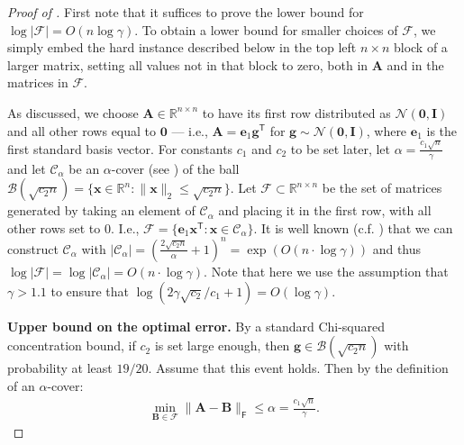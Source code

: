 \documentclass{article}[11pt]
\theoremstyle{definition}
\newcommand{\bv}[1]{\boldsymbol{\mathbf{#1}}}
\newcommand{\R}{\mathbb{R}}
\newcommand{\T}{\mathsf{T}}
\newcommand{\Fro}{\mathsf{F}}
\newcommand{\F}{\mathcal{F}}
\newcommand{\transpose}{\mathsf{T}}
\begin{document}
\begin{proof}[Proof of ]
    First note that it suffices to prove the lower bound for  $\log |\F| = O(n \log \gamma)$. To obtain a lower bound for smaller choices of $\F$, we simply embed the hard instance described below in the top left $n\times n$ block of a larger matrix, setting all values not in that block to zero, both in $\bv{A}$ and in the matrices in $\mathcal{F}$. 

As discussed, we choose $\bv{A} \in \R^{n \times n}$ to have its first row distributed as $\mathcal{N}(\bv 0, \bv I)$ and all other rows equal to $\bv{0}$
 --- i.e., $\bv A = \bv{e}_1 \bv g^\transpose$ for $\bv g\sim \mathcal{N}(\bv 0, \bv I)$, where $\bv{e}_1$ is the first standard basis vector.
%
 For constants $c_1$ and $c_2$ to be set later, let $\alpha = \frac{c_1 \sqrt{n}}{\gamma}$ and let  $\mathcal{C}_\alpha$ be an $\alpha$-cover (see ) of the ball $\mathcal{B}(\sqrt{c_2 n}) = \{\bv x \in \R^n : \|\bv x\|_2 \le \sqrt{c_2 n}\}$. Let $\F \subset \R^{n\times n}$ be the set of matrices generated by taking an element of $\mathcal C_\alpha$ and placing it in the first row, with all other rows set to $0$. I.e., $\F = \{\bv{e}_1 \bv x^\T : \bv x \in \mathcal C_\alpha\}$. It is well known (c.f. \cite[Corollary 4.2.13]{Vershynin2018}) that we can construct $\mathcal C_\alpha$ with $|\mathcal C_\alpha | = \left (\frac{2 \sqrt{c_2 n}}{\alpha} +1\right )^n = \exp(O(n \cdot \log\gamma))$ and thus $\log|\F| = \log|\mathcal C_\alpha| = O(n \cdot \log \gamma)$. Note that here we use the assumption that $\gamma > 1.1$ to ensure that $\log(2 \gamma\sqrt{c_2}/c_1+1) = O(\log \gamma)$.
 
\smallskip

\noindent \textbf{Upper bound on the optimal error.}
By a standard Chi-squared concentration  bound, if $c_2$ is set large enough, then $\bv g \in \mathcal{B}(\sqrt{c_2 n})$ with probability at least $19/20$. 
Assume that this event holds. Then by the definition of an $\alpha$-cover:
\begin{align}\label{eq:camMinBound}
    \min_{\bv B \in \F} \|\bv A - \bv B\|_\Fro \le \alpha = \frac{c_1 \sqrt{n}}{\gamma}.
\end{align}

\smallskip


\end{proof}
\end{document}
